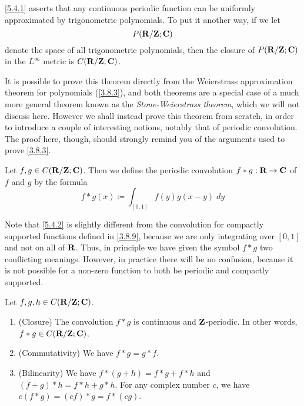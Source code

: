 \begin{note}
  \cref{5.4.1} asserts that any continuous periodic function can be uniformly approximated by trigonometric polynomials.
  To put it another way, if we let
  \[
    P(\mathbf{R} / \mathbf{Z} ; \mathbf{C})
  \]
  denote the space of all trigonometric polynomials, then the closure of \(P(\mathbf{R} / \mathbf{Z} ; \mathbf{C})\) in the \(L^\infty\) metric is \(C(\mathbf{R} / \mathbf{Z} ; \mathbf{C})\).
\end{note}

\begin{note}
  It is possible to prove this theorem directly from the Weierstrass approximation theorem for polynomials (\cref{3.8.3}), and both theorems are a special case of a much more general theorem known as the \emph{Stone-Weierstrass theorem}, which we will not discuss here.
  However we shall instead prove this theorem from scratch, in order to introduce a couple of interesting notions, notably that of periodic convolution.
  The proof here, though, should strongly remind you of the arguments used to prove \cref{3.8.3}.
\end{note}

\begin{definition}\label{5.4.2}
  Let \(f, g \in C(\mathbf{R} / \mathbf{Z} ; \mathbf{C})\).
  Then we define the periodic convolution \(f * g : \mathbf{R} \to \mathbf{C}\) of \(f\) and \(g\) by the formula
  \[
    f * g(x) \coloneqq \int_{[0, 1]} f(y) g(x - y) \; dy
  \]
\end{definition}

\begin{remark}\label{5.4.3}
  Note that \cref{5.4.2} is slightly different from the convolution for compactly supported functions defined in \cref{3.8.9}, because we are only integrating over \([0, 1]\) and not on all of \(\mathbf{R}\).
  Thus, in principle we have given the symbol \(f * g\) two conflicting meanings.
  However, in practice there will be no confusion, because it is not possible for a non-zero function to both be periodic and compactly supported.
\end{remark}

\begin{lemma}\label{5.4.4}
  Let \(f, g, h \in C(\mathbf{R} / \mathbf{Z} ; \mathbf{C})\).
  \begin{enumerate}
    \item (Closure)
          The convolution \(f * g\) is continuous and \(\mathbf{Z}\)-periodic.
          In other words, \(f * g \in C(\mathbf{R} / \mathbf{Z} ; \mathbf{C})\).
    \item (Commutativity)
          We have \(f * g = g * f\).
    \item (Bilinearity)
          We have \(f * (g + h) = f * g + f * h\) and \((f + g) * h = f * h + g * h\).
          For any complex number \(c\), we have \(c(f * g) = (cf) * g = f * (cg)\).
  \end{enumerate}
\end{lemma}

